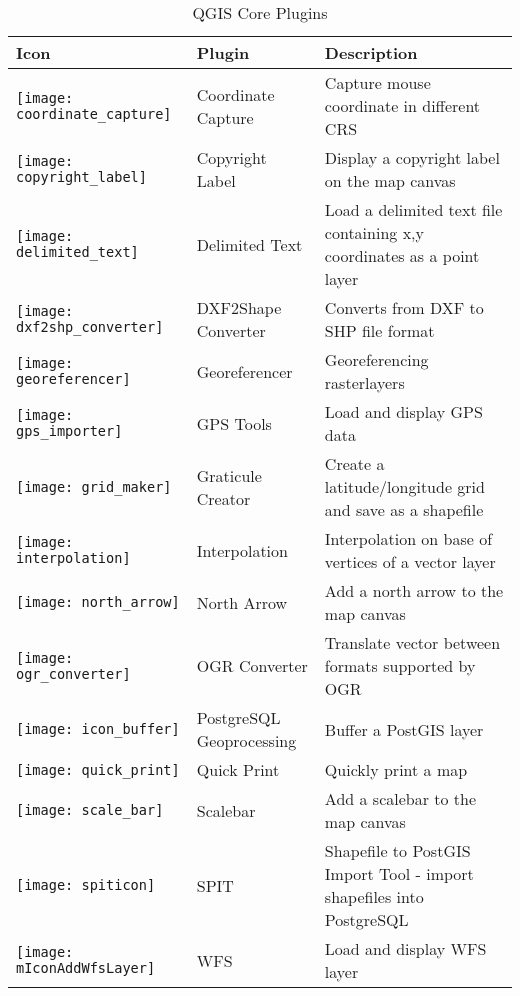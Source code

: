 \begin{minipage}{\textwidth}
\begin{table}[H]
\centering
\caption{QGIS Core Plugins}\label{tab:core_plugins}\medskip
\small
 \begin{tabular}{|l|l|p{4in}|}
\hline \textbf{Icon} & \textbf{Plugin} & \textbf{Description} \\
\hline
\texttt{[image: coordinate\_capture]}
 & Coordinate Capture \index{plugins!coordinate capture}& Capture mouse coordinate in different CRS\\
\hline 
\texttt{[image: copyright\_label]}
 & Copyright Label \index{plugins!copyright}& Display a copyright label on the map canvas\\
\hline 
\texttt{[image: delimited\_text]}
 & Delimited Text \index{plugins!delimited text}& Load a delimited text file 
containing x,y coordinates as a point layer \\
\hline 
\texttt{[image: dxf2shp\_converter]}
 & DXF2Shape Converter \index{plugins!DXF2Shape}& Converts from DXF to SHP file format \\
\hline
\texttt{[image: georeferencer]}
 & Georeferencer \index{plugin!georeferencer} & Georeferencing rasterlayers \\
\hline 
\texttt{[image: gps\_importer]}
 & GPS Tools \index{plugins!gps}& Load and display GPS data \\
\hline
\texttt{[image: grid\_maker]}
 & Graticule Creator \index{plugins!graticule}& Create a latitude/longitude grid and save as a shapefile\\
\hline
\texttt{[image: interpolation]}
& Interpolation \index{plugins!Interpolation}& Interpolation on base of vertices of a vector layer\\
\hline
\texttt{[image: north\_arrow]}
& North Arrow \index{plugins!north arrow}& Add a north arrow to the map canvas\\
\hline
\texttt{[image: ogr\_converter]}
 & OGR Converter \index{plugins!OGR converter}& Translate vector between formats supported by OGR \\
\hline
\texttt{[image: icon\_buffer]}
 & PostgreSQL Geoprocessing \index{plugins!geoprocessing}& Buffer a PostGIS layer \\
\hline
\texttt{[image: quick\_print]}
 & Quick Print \index{plugins!quickprint}& Quickly print a map \\
\hline
\texttt{[image: scale\_bar]}
 & Scalebar \index{plugins!scalebar}& Add a scalebar to the map canvas\\
\hline
\texttt{[image: spiticon]}
 & SPIT \index{plugins!spit}& Shapefile to PostGIS Import Tool - import shapefiles into PostgreSQL\\
\hline 
\texttt{[image: mIconAddWfsLayer]}
 & WFS & Load and display WFS layer \\
\hline
\end{tabular}
\end{table}
\end{minipage}

